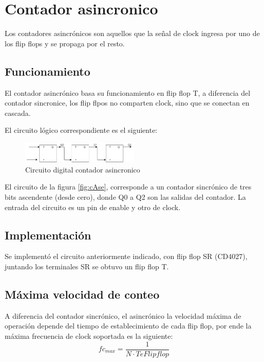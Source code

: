 \documentclass[../../e3_tp2_main.tex]{subfiles}
\begin{document}
\section{Contador asincronico}
Los contadores asincrónicos son aquellos que la señal de clock ingresa por uno de los flip flops y se propaga por el resto.

\subsection{Funcionamiento}

El contador asincrónico basa su funcionamiento en flip flop T, a diferencia del contador sincronice, los flip flpos no comparten clock, sino que se conectan en cascada. 
\par El circuito lógico correspondiente es el siguiente:


\begin{figure}[H]	
	\centering
	\includegraphics[width=0.5\textwidth]{imagenes/cas_b.png}
	\caption{Circuito digital contador asincronico}\label{fig:case}
\end{figure}

El circuito de la figura \ref{fig:cAse}, corresponde a un contador sincrónico de tres bits ascendente (desde cero), donde Q0 a Q2 son las salidas del contador. La entrada del circuito es un pin de enable y otro de clock.

\subsection{Implementación}
Se implementó el circuito anteriormente indicado, con flip flop SR (CD4027), juntando los terminales SR se obtuvo un flip flop T.

\subsection{Máxima velocidad de conteo}
A diferencia del contador sincrónico, el asincrónico la velocidad máxima de operación depende del tiempo de establecimiento de cada flip flop, por ende la máxima frecuencia de clock soportada es la siguiente:
$$fc_{max}=\frac{1}{N \cdot TeFlipflop } $$
\end{document}
